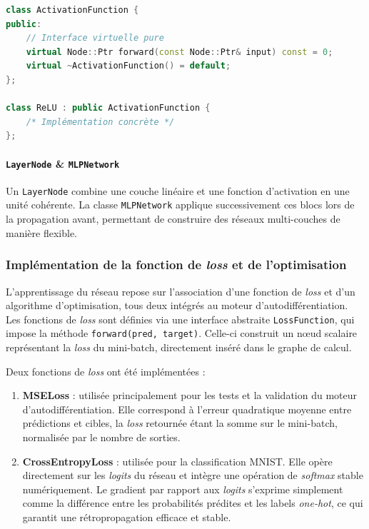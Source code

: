\documentclass[a4paper,11pt]{article}
\begin{document}
\begin{lstlisting}[language=C++, caption={Polymorphisme pour les activations}]
class ActivationFunction {
public:
    // Interface virtuelle pure
    virtual Node::Ptr forward(const Node::Ptr& input) const = 0;
    virtual ~ActivationFunction() = default;
};

class ReLU : public ActivationFunction { 
    /* Implémentation concrète */ 
};
\end{lstlisting}

\paragraph{\texttt{LayerNode} \& \texttt{MLPNetwork}} Un \texttt{LayerNode} combine une couche linéaire et une fonction d'activation en une unité cohérente. La classe \texttt{MLPNetwork} applique successivement ces blocs lors de la propagation avant, permettant de construire des réseaux multi-couches de manière flexible.

\subsubsection{Implémentation de la fonction de \textit{loss} et de l'optimisation}
L'apprentissage du réseau repose sur l'association d'une fonction de \textit{loss} et d'un algorithme d'optimisation, tous deux intégrés au moteur d'autodifférentiation. Les fonctions de \textit{loss} sont définies via une interface abstraite \texttt{LossFunction}, qui impose la méthode \texttt{forward(pred, target)}. Celle-ci construit un nœud scalaire représentant la \textit{loss} du mini-batch, directement inséré dans le graphe de calcul.

Deux fonctions de \textit{loss} ont été implémentées :
\begin{enumerate}[label=\arabic*.]
  \item \textbf{MSELoss} : utilisée principalement pour les tests et la validation du moteur d'autodifférentiation. Elle correspond à l'erreur quadratique moyenne entre prédictions et cibles, la \textit{loss} retournée étant la somme sur le mini-batch, normalisée par le nombre de sorties.
  \item \textbf{CrossEntropyLoss} : utilisée pour la classification MNIST. Elle opère directement sur les \textit{logits} du réseau et intègre une opération de \textit{softmax} stable numériquement. Le gradient par rapport aux \textit{logits} s'exprime simplement comme la différence entre les probabilités prédites et les labels \textit{one-hot}, ce qui garantit une rétropropagation efficace et stable.
\end{enumerate}
\end{document}
